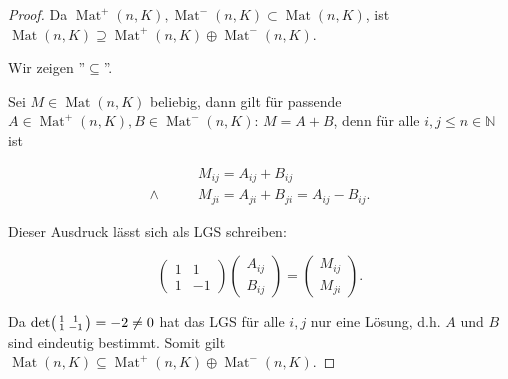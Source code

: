 \documentclass{article}
\newcommand{\NN}{\mathbb{N}}
\DeclareMathOperator{\Mat}{Mat}
\begin{document}
\begin{proof}
    Da $\Mat^+(n, K), \Mat^-(n, K) \subset \Mat(n,K)$,
    ist $\Mat(n,K) \supseteq \Mat^+(n, K) \oplus \Mat^-(n, K)$.

    Wir zeigen ''$\subseteq$''.
    
    Sei $M \in \Mat(n,K)$ beliebig, dann gilt für passende
    $A \in \Mat^+(n,K), B \in \Mat^-(n,K)$:
    $M = A+B$, denn für alle
    $i,j \leq n \in \NN$ ist

    \[
    \begin{aligned}
        & M_{ij} = A_{ij} + B_{ij} \\
        \land\qquad
        & M_{ji} = A_{ji} + B_{ji} = A_{ij} - B_{ij}.
    \end{aligned}
    \]

    Dieser Ausdruck lässt sich als LGS schreiben:

    \[
    \begin{pmatrix}
        1 & 1 \\
        1 & -1
    \end{pmatrix}
    \begin{pmatrix}
        A_{ij} \\
        B_{ij}
    \end{pmatrix}
    =
    \begin{pmatrix}
        M_{ij} \\
        M_{ji}
    \end{pmatrix}.
    \]

    Da $\det\begin{psmallmatrix}
        1 & 1 \\
        1 & -1
    \end{psmallmatrix} = -2 \neq 0$
    hat das LGS für alle $i,j$ nur eine Lösung,
    d.h. $A$ und $B$ sind eindeutig bestimmt.
    Somit gilt $\Mat(n,K) \subseteq \Mat^+(n, K) \oplus \Mat^-(n, K)$.
\end{proof}
\end{document}
